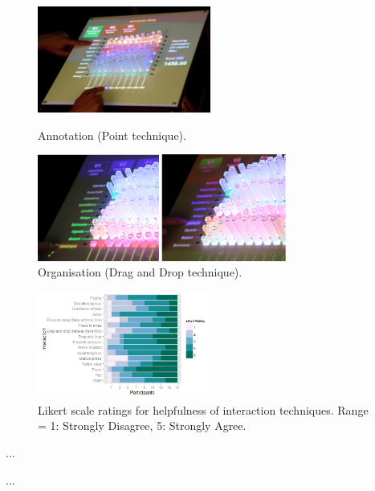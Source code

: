 \documentclass[11pt]{article}
\begin{document}
\begin{figure}[H]
\centering
  \includegraphics[height=3.5cm]{img/taher2015-annotation.png}
  \caption{Annotation (Point technique).}\label{fig:taher2015-annotation}
\endminipage\hfill
{}%
\centering
  \includegraphics[height=3.5cm]{img/taher2015-organize.png}
  \caption{Organisation (Drag and Drop technique).}\label{fig:taher2015-organize}
\endminipage
\end{figure}

\begin{figure}[H]
\centering
\includegraphics[width=0.5\textwidth]{img/taher2015-likert.png} 
\caption{Likert scale ratings for helpfulness of interaction
techniques. Range = 1: Strongly Disagree, 5: Strongly Agree.}\label{fig:taher2015-likert}
\end{figure}

...

...


\newpage
\small

\normalsize
\end{document}
